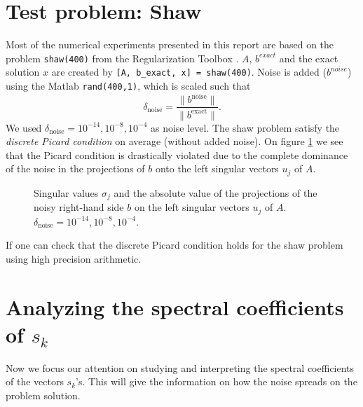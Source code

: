 \documentclass[11pt]{amsart}
\begin{document}
\section{Test problem: Shaw}
Most of the numerical experiments presented in this report are based on the 
problem \texttt{shaw(400)} from the Regularization Toolbox \cite{hansen}. $A$,
$b^{exact}$ and the exact solution $x$ are created by 
\texttt{[A, b\_exact, x] = shaw(400)}. Noise is added ($b^{noise}$) using the
Matlab \texttt{rand(400,1)}, which is scaled such that
\begin{equation*}
  \delta_{\text{noise}} = \frac{\|b^{\text{noise}}\|}{\|b^{\text{exact}}\|}.
\end{equation*}
We used $\delta_{\text{noise}} = 10^{-14}, 10^{-8}, 10^{-4}$ as noise level.
The shaw problem satisfy the \emph{discrete Picard condition} on average 
(without added noise). On figure \ref{fig:picard} we see that the Picard 
condition is drastically violated due to the complete dominance of the noise in
the projections of $b$ onto the left singular vectors $u_{j}$ of $A$.
\begin{figure}[htb] \label{fig:picard}
  \begin{center}
  \end{center}
\caption{Singular values $\sigma_{j}$ and the absolute value of the
projections of the noisy right-hand side $b$ on the left singular vectors 
$u_{j}$ of $A$. $\delta_{\text{noise}} = 10^{-14}, 10^{-8}, 10^{-4}$.}
\end{figure}
If one can check that the discrete Picard condition holds for the shaw problem
using high precision arithmetic.

\section{Analyzing the spectral coefficients of $s_{k}$}
Now we focus our attention on studying and interpreting the spectral 
coefficients of the vectors $s_{k}$'s. This will give the information on how the
noise spreads on the problem solution.
\end{document}

